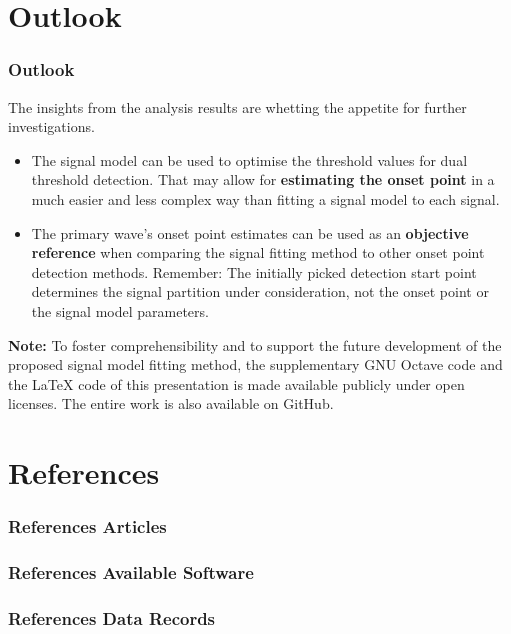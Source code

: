 	\section{Outlook}
	\begin{frame}
		\frametitle{Outlook}
		The insights from the analysis results are whetting the appetite for further investigations.
		\vspace*{1em}
		\begin{itemize}
			\item The signal model can be used to optimise the threshold values for dual threshold detection. That may allow for \textbf{estimating the onset point} in a much easier and less complex way than fitting a signal model to each signal.
			\item The primary wave's onset point estimates can be used as an \textbf{objective reference} when comparing the signal fitting method to other onset point detection methods. Remember: The initially picked detection start point determines the signal partition under consideration, not the onset point or the signal model parameters.
		\end{itemize}
		\vspace*{.5em}
		\small \textbf{Note:} To foster comprehensibility and to support the future development of the proposed signal model fitting method, the supplementary GNU Octave code\autocite{code} and the \LaTeX{} code\autocite{latex} of this presentation is made available publicly under open licenses\autocite{agplv3,ccby40}. The entire work is also available on GitHub\autocite{repogit}.
	\end{frame}

	\section*{References}
	\begin{frame}[noframenumbering]
		\frametitle{References \textendash{} Articles}
		\small
		\printbibliography[heading=subbibintoc,category=article,title={Articles}]
	\end{frame}
	
	\begin{frame}[noframenumbering]
		\frametitle{References \textendash{} Available Software}
		\small
		\printbibliography[heading=subbibintoc,category=software,title={Available Software}]
	\end{frame}
	
	\begin{frame}[noframenumbering]
		\frametitle{References \textendash{} Data Records}
		\small
		\printbibliography[heading=subbibintoc,category=dataset,title={Data Records}]
	\end{frame}
	
